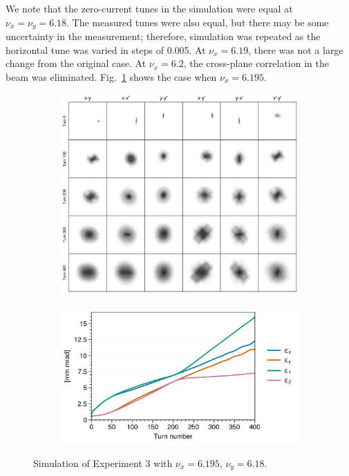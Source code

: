 We note that the zero-current tunes in the simulation were equal at $\nu_x = \nu_y = 6.18$. The measured tunes were also equal, but there may be some uncertainty in the measurement; therefore, simulation was repeated as the horizontal tune was varied in steps of 0.005. At $\nu_x = 6.19$, there was not a large change from the original case. At $\nu_x = 6.2$, the cross-plane correlation in the beam was eliminated. Fig.~\ref{fig:exp3_sim_nux6.195_nuy6.18} shows the case when $\nu_x = 6.195$. 
%
\begin{figure}[!p]
    \centering
    \begin{subfigure}{0.85\textwidth}
        \includegraphics[width=\textwidth]{Images/chapter5/exp3/sim_snapshots_nux6.195_nuy6.18.png}
    \end{subfigure}
    \vfill
    \vspace*{1.0cm}
    \vfill
    \begin{subfigure}{0.7\textwidth}
        \includegraphics[width=\textwidth]{Images/chapter5/exp3/sim_emittances_nux6.195_nuy6.18.png}
    \end{subfigure}
    \caption{Simulation of Experiment 3 with $\nu_x = 6.195$, $\nu_y = 6.18$.}
    \label{fig:exp3_sim_nux6.195_nuy6.18}
\end{figure}

